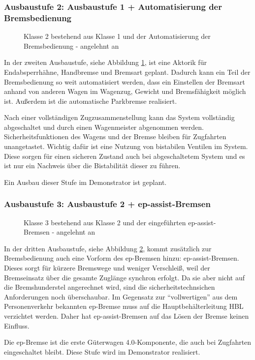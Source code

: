 \subsubsection{Ausbaustufe 2: Ausbaustufe 1 + Automatisierung der Bremsbedienung}
\begin{figure}[htbp] 
    
    \caption{Klasse 2 bestehend aus Klasse 1 und der Automatisierung der Bremsbedienung - angelehnt an \cite{ETR_3}}
    \label{fig:Klasse2}
\end{figure} 
In der zweiten Ausbaustufe, siehe Abbildung \ref{fig:Klasse2}, ist eine Aktorik für Endabsperrhähne, Handbremse und \gls{Bremsart} geplant. Dadurch kann ein Teil der Bremsbedienung so weit automatisiert werden, dass ein Einstellen der \gls{Bremsart} anhand von anderen Wagen im \gls{Wagenzug}, Gewicht und Bremsfähigkeit möglich ist. Außerdem ist die automatische Parkbremse realisiert.\par
Nach einer vollständigen Zugzusammenstellung kann das System vollständig abgeschaltet und durch einen Wagenmeister abgenommen werden. Sicherheitsfunktionen des Wagens und der Bremse bleiben für Zugfahrten unangetastet. Wichtig dafür ist eine Nutzung von bistabilen Ventilen im System. Diese sorgen für einen sicheren Zustand auch bei abgeschaltetem System und es ist nur ein Nachweis über die Bistabilität dieser zu führen.\par
Ein Ausbau dieser Stufe im Demonstrator ist geplant.

\subsubsection{Ausbaustufe 3: Ausbaustufe 2 + ep-assist-Bremsen}
\begin{figure}[htbp] 
    
    \caption{Klasse 3 bestehend aus Klasse 2 und der eingeführten ep-assist-Bremsen - angelehnt an \cite{ETR_3}}
    \label{fig:Klasse3}
\end{figure} 
In der dritten Ausbaustufe, siehe Abbildung \ref{fig:Klasse3}, kommt zusätzlich zur Bremsbedienung auch eine Vorform des \gls{ep-Bremsen} hinzu: \gls{ep-assist-Bremsen}. Dieses sorgt für kürzere Bremswege und weniger Verschleiß, weil der Bremseinsatz über die gesamte Zuglänge synchron erfolgt. Da sie aber nicht auf die Bremshunderstel angerechnet wird, sind die sicherheitstechnsichen Anforderungen noch überschaubar. Im Gegensatz zur "`vollwertigen"' aus dem Personenverkehr bekannten ep-Bremse muss auf die Hauptbehälterleitung HBL verzichtet werden. Daher hat ep-assist-Bremsen auf das Lösen der Bremse keinen Einfluss.\par
Die ep-Bremse ist die erste Güterwagen 4.0-Komponente, die auch bei Zugfahrten eingeschaltet bleibt. Diese Stufe wird im Demonstrator realisiert.

